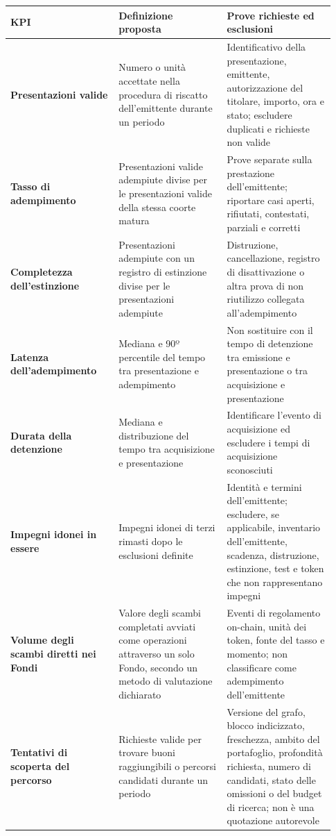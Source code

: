 \documentclass[11pt]{article}
\begin{document}
\begin{longtable}{P{0.31\linewidth} P{0.31\linewidth} P{0.31\linewidth}}
\toprule
KPI & Definizione proposta & Prove richieste ed esclusioni \\
\midrule
\endhead
\textbf{Presentazioni valide} & Numero o unità accettate nella procedura di riscatto dell'emittente durante un periodo & Identificativo della presentazione, emittente, autorizzazione del titolare, importo, ora e stato; escludere duplicati e richieste non valide \\
\textbf{Tasso di adempimento} & Presentazioni valide adempiute divise per le presentazioni valide della stessa coorte matura & Prove separate sulla prestazione dell'emittente; riportare casi aperti, rifiutati, contestati, parziali e corretti \\
\textbf{Completezza dell'estinzione} & Presentazioni adempiute con un registro di estinzione divise per le presentazioni adempiute & Distruzione, cancellazione, registro di disattivazione o altra prova di non riutilizzo collegata all'adempimento \\
\textbf{Latenza dell'adempimento} & Mediana e 90º percentile del tempo tra presentazione e adempimento & Non sostituire con il tempo di detenzione tra emissione e presentazione o tra acquisizione e presentazione \\
\textbf{Durata della detenzione} & Mediana e distribuzione del tempo tra acquisizione e presentazione & Identificare l'evento di acquisizione ed escludere i tempi di acquisizione sconosciuti \\
\textbf{Impegni idonei in essere} & Impegni idonei di terzi rimasti dopo le esclusioni definite & Identità e termini dell'emittente; escludere, se applicabile, inventario dell'emittente, scadenza, distruzione, estinzione, test e token che non rappresentano impegni \\
\textbf{Volume degli scambi diretti nei Fondi} & Valore degli scambi completati avviati come operazioni attraverso un solo Fondo, secondo un metodo di valutazione dichiarato & Eventi di regolamento on-chain, unità dei token, fonte del tasso e momento; non classificare come adempimento dell'emittente \\
\textbf{Tentativi di scoperta del percorso} & Richieste valide per trovare buoni raggiungibili o percorsi candidati durante un periodo & Versione del grafo, blocco indicizzato, freschezza, ambito del portafoglio, profondità richiesta, numero di candidati, stato delle omissioni o del budget di ricerca; non è una quotazione autorevole \\

\end{longtable}
\end{document}
